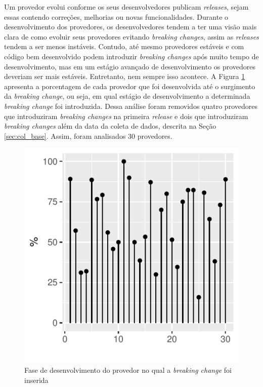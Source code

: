Um provedor evolui conforme os seus desenvolvedores publicam \textit{releases}, sejam essas contendo correções, melhorias ou novas funcionalidades. Durante o desenvolvimento dos provedores, os desenvolvedores tendem a ter uma visão mais clara de como evoluir seus provedores evitando \textit{breaking changes}, assim as \textit{releases} tendem a ser menos instáveis. Contudo, até mesmo provedores estáveis e com código bem desenvolvido podem introduzir \textit{breaking changes} após muito tempo de desenvolvimento, mas em um estágio avançado de desenvolvimento os provedores deveriam ser mais estáveis. Entretanto, nem sempre isso acontece. A Figura \ref{fig:providers_releases_bc} apresenta a porcentagem de cada provedor que foi desenvolvida até o surgimento da \textit{breaking change}, ou seja, em qual estágio de desenvolvimento a determinada \textit{breaking change} foi introduzida. Dessa análise foram removidos quatro provedores que introduziram \textit{breaking changes} na primeira \textit{release} e dois que introduziram \textit{breaking changes} além da data da coleta de dados, descrita na Seção \ref{sec:col_base}. Assim, foram analisados 30 provedores. 

\begin{figure}
	\centering
	\includegraphics{figuras/providers_releases_bc.pdf}
	\caption{Fase de desenvolvimento do provedor no qual a \textit{breaking change} foi inserida}
	\label{fig:providers_releases_bc}
\end{figure}{}

